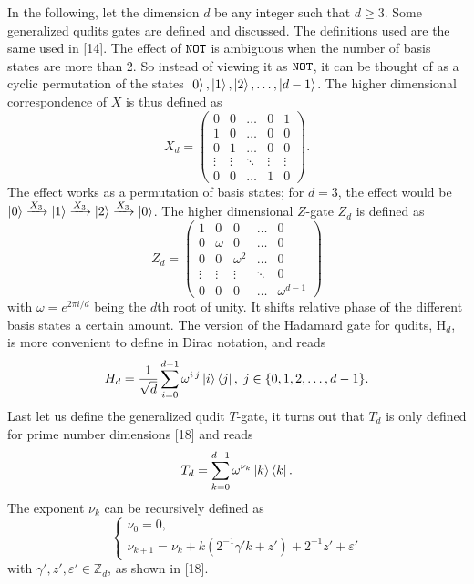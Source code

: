In the following, let the dimension $d$ be any integer such that $d \geq 3$. Some generalized qudits gates are defined and discussed. The definitions used are the same used in [14].
The effect of ${\tt NOT}$ is ambiguous when the number of basis states are more than 2. So instead of viewing it as ${\tt NOT}$, it can be thought of as a cyclic permutation of the states $\ket{0},\ket{1}, \ket{2}, \dots, \ket{d-1}$. The higher dimensional correspondence of $X$ is thus defined as
\begin{equation}
X_d = \begin{pmatrix}
0 & 0 & \dots & 0 & 1\\
1 & 0 & \dots & 0 & 0\\
0 & 1 & \dots & 0 & 0\\
\vdots & \vdots &\ddots& \vdots&\vdots\\
0 & 0& \dots & 1 & 0
\end{pmatrix}.
\end{equation}
The effect works as a permutation of basis states; for $d = 3$, the effect would be $\ket{0} \xrightarrow{X_3} \ket{1} \xrightarrow{X_3} \ket{2} \xrightarrow{X_3} \ket{0}$.
The higher dimensional $Z$-gate $Z_d$ is defined as 
\begin{equation}
Z_d = \begin{pmatrix}
1 & 0 & 0 & \dots & 0 \\
0 & \omega & 0 &\dots & 0\\
0 & 0 & \omega^2&\dots & 0 \\
\vdots & \vdots&\vdots&\ddots& 0\\
0 & 0& 0&\dots  & \omega^{d-1}
\end{pmatrix}
\end{equation}
with $\omega = e^{2\pi i/d}$ being the $d$th root of unity. It shifts relative phase of the different basis states a certain amount. The version of the Hadamard gate for qudits, H$_d$, is more convenient to define in Dirac notation, and reads
\begin{equation}
H_d = \dfrac{1}{\sqrt{d}}\sum_{i=0}^{d-1} \omega^{i\,j}\ket{i}\bra{j},\; j\in \{0,1,2, \dots, d-1\}.
\end{equation}
Last let us define the generalized qudit $T$-gate, it turns out that $T_d$ is only defined for prime number dimensions [18] and reads
\begin{equation}
T_d = \sum_{k=0}^{d-1} \omega^{\nu_k}\ket{k}\bra{k}.
\end{equation}
The exponent $\nu_k$ can be recursively defined as
\begin{equation}
\begin{cases}
\nu_0 = 0,\\
\nu_{k+1} = \nu_k + k(2^{-1}\gamma'k + z') + 2^{-1}z' + \varepsilon'
\end{cases}
\end{equation} 
with $\gamma',z',\varepsilon' \in \mathbb{Z}_d$, as shown in [18].

